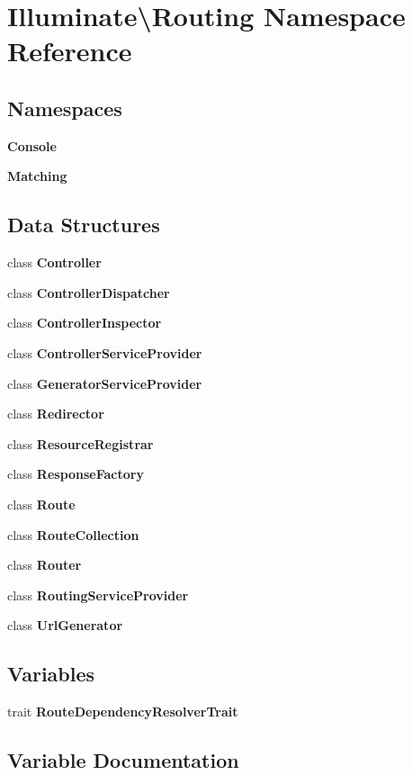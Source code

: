 \section{Illuminate\textbackslash{}Routing Namespace Reference}
\label{namespace_illuminate_1_1_routing}
\subsection*{Namespaces}
\begin{DoxyCompactItemize}
\item 
 {\bf Console}
\item 
 {\bf Matching}
\end{DoxyCompactItemize}
\subsection*{Data Structures}
\begin{DoxyCompactItemize}
\item 
class {\bf Controller}
\item 
class {\bf Controller\+Dispatcher}
\item 
class {\bf Controller\+Inspector}
\item 
class {\bf Controller\+Service\+Provider}
\item 
class {\bf Generator\+Service\+Provider}
\item 
class {\bf Redirector}
\item 
class {\bf Resource\+Registrar}
\item 
class {\bf Response\+Factory}
\item 
class {\bf Route}
\item 
class {\bf Route\+Collection}
\item 
class {\bf Router}
\item 
class {\bf Routing\+Service\+Provider}
\item 
class {\bf Url\+Generator}
\end{DoxyCompactItemize}
\subsection*{Variables}
\begin{DoxyCompactItemize}
\item 
trait {\bf Route\+Dependency\+Resolver\+Trait}
\end{DoxyCompactItemize}


\subsection{Variable Documentation}
